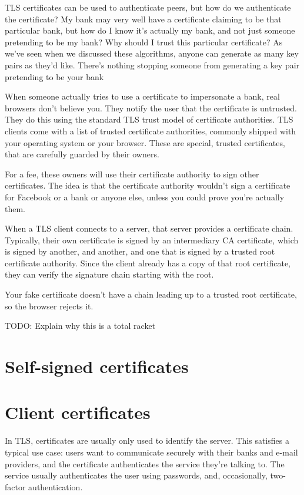 \documentclass[11pt,ebook,table,dvipsnames]{memoir}
\begin{document}
TLS certificates can be used to authenticate peers, but how do we
authenticate the certificate? My bank may very well have a certificate
claiming to be that particular bank, but how do I know it's actually
my bank, and not just someone pretending to be my bank? Why should I
trust this particular certificate? As we've seen when we discussed
these algorithms, anyone can generate as many key pairs as they'd
like. There's nothing stopping someone from generating a key pair
pretending to be your bank

When someone actually tries to use a certificate to impersonate a
bank, real browsers don't believe you. They notify the user that the
certificate is untrusted. They do this using the standard TLS trust
model of certificate authorities. TLS clients come with a list of
trusted certificate authorities, commonly shipped with your operating
system or your browser. These are special, trusted certificates, that
are carefully guarded by their owners.

For a fee, these owners will use their certificate authority to sign
other certificates. The idea is that the certificate authority
wouldn't sign a certificate for Facebook or a bank or anyone else,
unless you could prove you're actually them.

When a TLS client connects to a server, that server provides a
certificate chain. Typically, their own certificate is signed by an
intermediary CA certificate, which is signed by another, and another,
and one that is signed by a trusted root certificate authority. Since
the client already has a copy of that root certificate, they can
verify the signature chain starting with the root.

Your fake certificate doesn't have a chain leading up to a trusted
root certificate, so the browser rejects it.

TODO: Explain why this is a total racket
\section{Self-signed certificates}
\label{sec-3-1-4}
\section{Client certificates}
\label{sec-3-1-5}

In TLS, certificates are usually only used to identify the server.
This satisfies a typical use case: users want to communicate securely
with their banks and e-mail providers, and the certificate
authenticates the service they're talking to. The service usually
authenticates the user using passwords, and, occasionally, two-factor
authentication.
\end{document}
